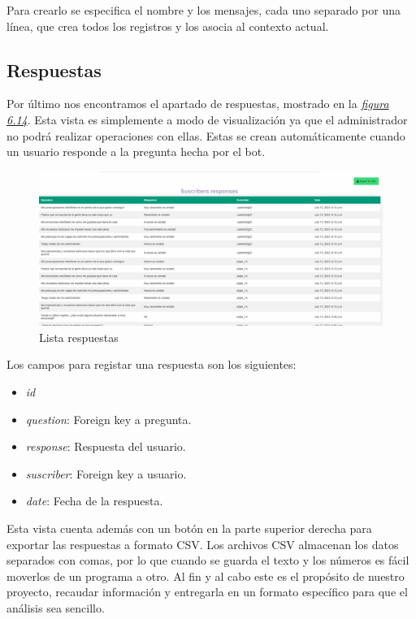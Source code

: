 Para crearlo se especifica el nombre y los mensajes, cada uno separado por una línea, que crea todos los registros y los asocia al contexto actual.\vspace{0.5cm}

\subsection{Respuestas}

Por último nos encontramos el apartado de respuestas, mostrado en la \textit{\hyperref[fig:list-answers]{figura 6.14}}. Esta vista es simplemente a modo de visualización ya que el administrador no podrá realizar operaciones con ellas. Estas se crean automáticamente cuando un usuario responde a la pregunta hecha por el bot. \vspace{1cm}

\begin{figure}[!ht]
    \centering
    \includegraphics[width=1\textwidth]{imagenes/list_answers.png}
    \caption{Lista respuestas}
    \label{fig:list-answers}
\end{figure}\vspace{0.5cm}



Los campos para registar una respuesta son los siguientes:

\begin{itemize}
    \item \textit{id}
    \item \textit{question}: Foreign key a pregunta.
    \item \textit{response}: Respuesta del usuario.
    \item \textit{suscriber}: Foreign key a usuario.
    \item \textit{date}: Fecha de la respuesta.
\end{itemize}

Esta vista cuenta además con un botón en la parte superior derecha para exportar las respuestas a formato CSV. Los archivos CSV almacenan los datos separados con comas, por lo que cuando se guarda el texto y los números es fácil moverlos de un programa a otro. Al fin y al cabo este es el propósito de nuestro proyecto, recaudar información y entregarla en un formato específico para que el análisis sea sencillo.\vspace{1cm} 

